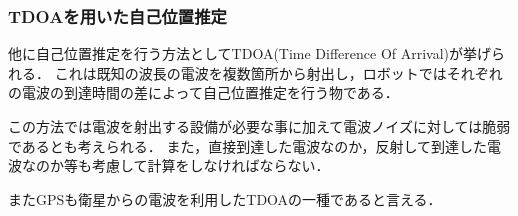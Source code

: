 \subsubsection{TDOAを用いた自己位置推定}
\label{tdoa_problem}
他に自己位置推定を行う方法としてTDOA(Time Difference Of Arrival)\cite{TDOA-UWB}が挙げられる．
これは既知の波長の電波を複数箇所から射出し，ロボットではそれぞれの電波の到達時間の差によって自己位置推定を行う物である．

この方法では電波を射出する設備が必要な事に加えて電波ノイズに対しては脆弱であるとも考えられる．
また，直接到達した電波なのか，反射して到達した電波なのか等も考慮して計算をしなければならない．

またGPSも衛星からの電波を利用したTDOAの一種であると言える．